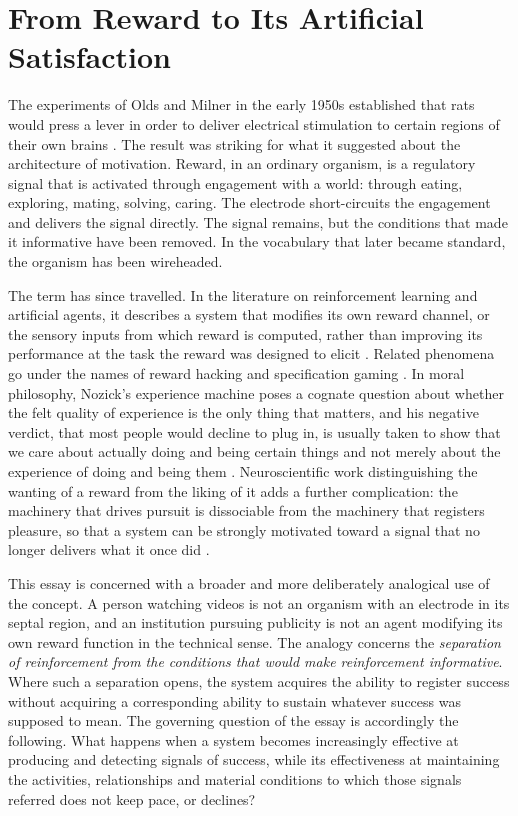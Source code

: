 \documentclass[11pt]{article}
\theoremstyle{definition}
\theoremstyle{remark}
\begin{document}
\section{From Reward to Its Artificial Satisfaction}

The experiments of Olds and Milner in the early 1950s established that rats would press a lever in order to deliver electrical stimulation to certain regions of their own brains \cite{olds1954}. The result was striking for what it suggested about the architecture of motivation. Reward, in an ordinary organism, is a regulatory signal that is activated through engagement with a world: through eating, exploring, mating, solving, caring. The electrode short-circuits the engagement and delivers the signal directly. The signal remains, but the conditions that made it informative have been removed. In the vocabulary that later became standard, the organism has been wireheaded.

The term has since travelled. In the literature on reinforcement learning and artificial agents, it describes a system that modifies its own reward channel, or the sensory inputs from which reward is computed, rather than improving its performance at the task the reward was designed to elicit \cite{ring2011,everitt2016}. Related phenomena go under the names of reward hacking and specification gaming \cite{amodei2016,skalse2022}. In moral philosophy, Nozick's experience machine poses a cognate question about whether the felt quality of experience is the only thing that matters, and his negative verdict, that most people would decline to plug in, is usually taken to show that we care about actually doing and being certain things and not merely about the experience of doing and being them \cite{nozick1974}. Neuroscientific work distinguishing the wanting of a reward from the liking of it adds a further complication: the machinery that drives pursuit is dissociable from the machinery that registers pleasure, so that a system can be strongly motivated toward a signal that no longer delivers what it once did \cite{berridge1998}.

This essay is concerned with a broader and more deliberately analogical use of the concept. A person watching videos is not an organism with an electrode in its septal region, and an institution pursuing publicity is not an agent modifying its own reward function in the technical sense. The analogy concerns the \emph{separation of reinforcement from the conditions that would make reinforcement informative}. Where such a separation opens, the system acquires the ability to register success without acquiring a corresponding ability to sustain whatever success was supposed to mean. The governing question of the essay is accordingly the following. What happens when a system becomes increasingly effective at producing and detecting signals of success, while its effectiveness at maintaining the activities, relationships and material conditions to which those signals referred does not keep pace, or declines?
\end{document}
